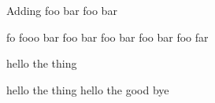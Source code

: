 Adding foo bar foo bar

fo fooo bar foo bar foo bar foo bar foo far

hello the thing

hello the thing hello the good bye
